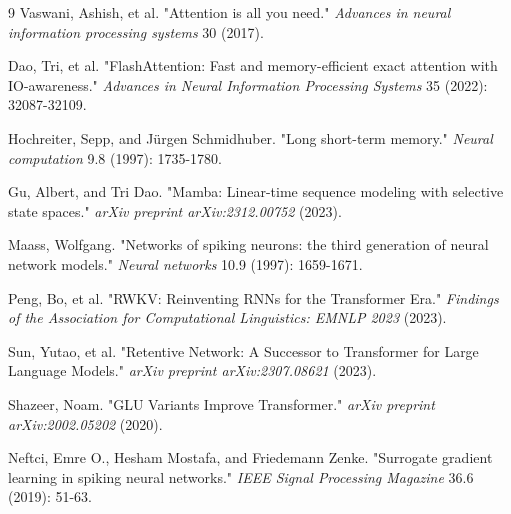 \documentclass[11pt,a4paper]{article}
\begin{document}
\begin{thebibliography}{9}
Vaswani, Ashish, et al. "Attention is all you need." \textit{Advances in neural information processing systems} 30 (2017).

Dao, Tri, et al. "FlashAttention: Fast and memory-efficient exact attention with IO-awareness." \textit{Advances in Neural Information Processing Systems} 35 (2022): 32087-32109.

Hochreiter, Sepp, and J{\"u}rgen Schmidhuber. "Long short-term memory." \textit{Neural computation} 9.8 (1997): 1735-1780.

Gu, Albert, and Tri Dao. "Mamba: Linear-time sequence modeling with selective state spaces." \textit{arXiv preprint arXiv:2312.00752} (2023).

Maass, Wolfgang. "Networks of spiking neurons: the third generation of neural network models." \textit{Neural networks} 10.9 (1997): 1659-1671.

Peng, Bo, et al. "RWKV: Reinventing RNNs for the Transformer Era." \textit{Findings of the Association for Computational Linguistics: EMNLP 2023} (2023).

Sun, Yutao, et al. "Retentive Network: A Successor to Transformer for Large Language Models." \textit{arXiv preprint arXiv:2307.08621} (2023).

Shazeer, Noam. "GLU Variants Improve Transformer." \textit{arXiv preprint arXiv:2002.05202} (2020).

Neftci, Emre O., Hesham Mostafa, and Friedemann Zenke. "Surrogate gradient learning in spiking neural networks." \textit{IEEE Signal Processing Magazine} 36.6 (2019): 51-63.
\end{thebibliography}
\end{document}
